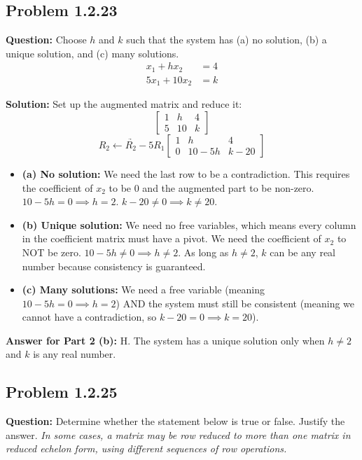\documentclass[11pt]{article}
\begin{document}
\subsection*{Problem 1.2.23}
\textbf{Question:} Choose $h$ and $k$ such that the system has (a) no solution, (b) a unique solution, and (c) many solutions.
\begin{align*}
    x_1 + hx_2 &= 4 \\
    5x_1 + 10x_2 &= k
\end{align*}

\textbf{Solution:}
Set up the augmented matrix and reduce it:
\[ \begin{bmatrix} 1 & h & 4 \\ 5 & 10 & k \end{bmatrix} \]
\[ \underrightarrow{R_2 \leftarrow R_2 - 5R_1} \begin{bmatrix} 1 & h & 4 \\ 0 & 10 - 5h & k - 20 \end{bmatrix} \]
\begin{itemize}
    \item \textbf{(a) No solution:} We need the last row to be a contradiction. This requires the coefficient of $x_2$ to be $0$ and the augmented part to be non-zero. 
    $10 - 5h = 0 \implies h = 2$.
    $k - 20 \neq 0 \implies k \neq 20$.
    \item \textbf{(b) Unique solution:} We need no free variables, which means every column in the coefficient matrix must have a pivot. We need the coefficient of $x_2$ to NOT be zero.
    $10 - 5h \neq 0 \implies h \neq 2$. As long as $h \neq 2$, $k$ can be any real number because consistency is guaranteed.
    \item \textbf{(c) Many solutions:} We need a free variable (meaning $10 - 5h = 0 \implies h = 2$) AND the system must still be consistent (meaning we cannot have a contradiction, so $k - 20 = 0 \implies k = 20$).
\end{itemize}
\textbf{Answer for Part 2 (b):} H. The system has a unique solution only when $h \neq 2$ and $k$ is any real number.


\subsection*{Problem 1.2.25}
\textbf{Question:} Determine whether the statement below is true or false. Justify the answer.
\textit{In some cases, a matrix may be row reduced to more than one matrix in reduced echelon form, using different sequences of row operations.}
\end{document}
